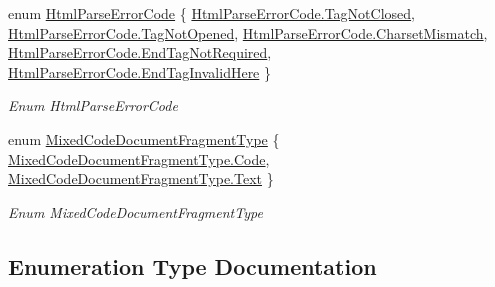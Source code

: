 \begin{DoxyCompactItemize}
\item 
enum \hyperlink{namespace_html_agility_pack_a73f43e39297685e4ddb8101f07585e45}{Html\+Parse\+Error\+Code} \{ \newline
\hyperlink{namespace_html_agility_pack_a73f43e39297685e4ddb8101f07585e45aa5306a0d91828e70050299ba0cb911f8}{Html\+Parse\+Error\+Code.\+Tag\+Not\+Closed}, 
\hyperlink{namespace_html_agility_pack_a73f43e39297685e4ddb8101f07585e45a92c71ed8a5e2459520b15541f8e38828}{Html\+Parse\+Error\+Code.\+Tag\+Not\+Opened}, 
\hyperlink{namespace_html_agility_pack_a73f43e39297685e4ddb8101f07585e45aa876bd560abedc4a329d8866ca2d71fb}{Html\+Parse\+Error\+Code.\+Charset\+Mismatch}, 
\hyperlink{namespace_html_agility_pack_a73f43e39297685e4ddb8101f07585e45a1ab12dd136c74b9861c62839fa8f1139}{Html\+Parse\+Error\+Code.\+End\+Tag\+Not\+Required}, 
\newline
\hyperlink{namespace_html_agility_pack_a73f43e39297685e4ddb8101f07585e45a3262a4682397a444b3f81a83e2822880}{Html\+Parse\+Error\+Code.\+End\+Tag\+Invalid\+Here}
 \}\begin{DoxyCompactList}\small\item\em Enum Html\+Parse\+Error\+Code \end{DoxyCompactList}
\item 
enum \hyperlink{namespace_html_agility_pack_a98759dfaafbba2b5cc44e142b78624fd}{Mixed\+Code\+Document\+Fragment\+Type} \{ \hyperlink{namespace_html_agility_pack_a98759dfaafbba2b5cc44e142b78624fdaca0dbad92a874b2f69b549293387925e}{Mixed\+Code\+Document\+Fragment\+Type.\+Code}, 
\hyperlink{namespace_html_agility_pack_a98759dfaafbba2b5cc44e142b78624fda9dffbf69ffba8bc38bc4e01abf4b1675}{Mixed\+Code\+Document\+Fragment\+Type.\+Text}
 \}\begin{DoxyCompactList}\small\item\em Enum Mixed\+Code\+Document\+Fragment\+Type \end{DoxyCompactList}
\end{DoxyCompactItemize}


\subsection{Enumeration Type Documentation}
\mbox{\label{namespace_html_agility_pack_a64d9f2b9c91f0f73e761936646ebcc57}} 
